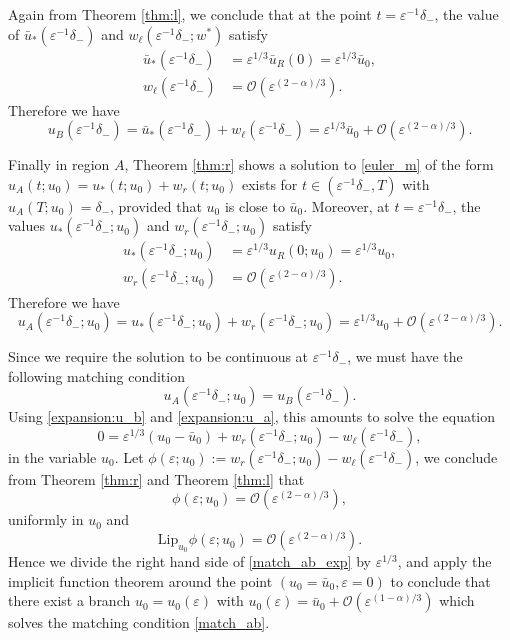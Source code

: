 \documentclass[letterpaper,11pt]{article}
\newcommand{\rmO}{\mathcal{O}}
\newcommand{\eps}{\varepsilon}
\numberwithin{equation}{section}
\theoremstyle{plain}
\begin{document}
Again from Theorem \ref{thm:l}, we conclude that at the point $t=\eps^{-1}\delta_-$, the value of $\bar{u}_*(\eps^{-1}\delta_-)$ and $w_\ell(\eps^{-1}\delta_-; w^*)$ satisfy
\begin{align*}
\bar{u}_*(\eps^{-1}\delta_-) &= \eps^{1/3}\bar{u}_R(0) = \eps^{1/3}\bar{u}_0, \\
w_\ell(\eps^{-1}\delta_-) &=  \rmO(\eps^{(2-\alpha)/3}).
\end{align*}
Therefore we have
\begin{equation}\label{expansion:u_b}
u_B(\eps^{-1}\delta_-)= \bar{u}_*(\eps^{-1}\delta_-)+w_\ell(\eps^{-1}\delta_-) = \eps^{1/3} \bar{u}_0+\rmO(\eps^{(2-\alpha)/3}).
\end{equation}

Finally in region $A$, Theorem \ref{thm:r} shows a solution to \eqref{euler_m} of the form $u_A(t;u_0) = u_*(t; u_0) + w_r(t; u_0)$ exists for $ t \in (\eps^{-1}\delta_-, T)$ with $u_A(T;u_0) = \delta_-$, provided that $u_0$ is close to $\bar{u}_0$. Moreover, at $t=\eps^{-1}\delta_-$, the values $u_*(\eps^{-1}\delta_-; u_0)$ and $w_r(\eps^{-1}\delta_-; u_0)$ satisfy
\begin{align*}
u_*(\eps^{-1}\delta_-; u_0) &= \eps^{1/3}u_R(0;u_0) =  \eps^{1/3}u_0,\\
w_r(\eps^{-1}\delta_-; u_0) &= \rmO(\eps^{(2-\alpha)/3}).
\end{align*}
Therefore we have
\begin{equation}\label{expansion:u_a}
u_A(\eps^{-1}\delta_-; u_0 ) = u_*(\eps^{-1}\delta_-; u_0)+ w_r(\eps^{-1}\delta_-; u_0)=\eps^{1/3}u_0 + \rmO(\eps^{(2-\alpha)/3}).
\end{equation}

Since we require the solution to be continuous at $\eps^{-1}\delta_-$, we must have the following matching condition
\begin{equation}\label{match_ab}
u_A(\eps^{-1}\delta_-; u_0) = u_B(\eps^{-1}\delta_-).
\end{equation}
Using \eqref{expansion:u_b} and \eqref{expansion:u_a}, this amounts to solve the equation
\begin{equation}\label{match_ab_exp}
0= \eps^{1/3}(u_0 - \bar{u}_0) + w_r(\eps^{-1}\delta_-; u_0)-w_\ell(\eps^{-1}\delta_-),
\end{equation}
in the variable $u_0$.
Let $\phi(\eps; u_0) :=  w_r(\eps^{-1}\delta_-; u_0)-w_\ell(\eps^{-1}\delta_-)$, we conclude from Theorem \ref{thm:r} and Theorem \ref{thm:l} that
\[
\phi(\eps; u_0) = \rmO(\eps^{(2-\alpha)/3}), 
\]
uniformly in $u_0$ and 
\[
\text{Lip}_{u_0} \phi(\eps; u_0) = \rmO(\eps^{(2-\alpha)/3}).
\]
Hence we divide the right hand side of \eqref{match_ab_exp} by $\eps^{1/3}$, and apply the implicit function theorem around the point $(u_0=\bar{u}_0, \eps=0)$ to conclude that there exist a branch $u_0 = u_0(\eps)$ with $u_0(\eps)  = \bar{u}_0 + \rmO(\eps^{(1-\alpha)/3})$ which solves the matching condition \eqref{match_ab}. 
\end{document}
